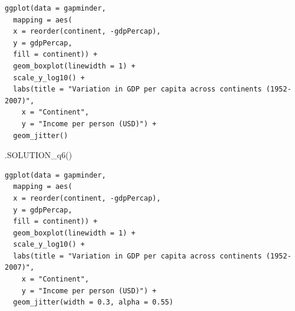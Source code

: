 \documentclass[
  letterpaper,
  DIV=11,
  numbers=noendperiod]{scrreprt}
\newenvironment{Shaded}{\begin{snugshade}}{\end{snugshade}}
\newcommand{\FunctionTok}[1]{\textcolor[rgb]{0.28,0.35,0.67}{#1}}
\newcommand{\NormalTok}[1]{\textcolor[rgb]{0.00,0.23,0.31}{#1}}
\begin{document}
\begin{verbatim}
ggplot(data = gapminder,
  mapping = aes(
  x = reorder(continent, -gdpPercap), 
  y = gdpPercap, 
  fill = continent)) +
  geom_boxplot(linewidth = 1) +
  scale_y_log10() +
  labs(title = "Variation in GDP per capita across continents (1952-2007)",
    x = "Continent",
    y = "Income per person (USD)") + 
  geom_jitter()
\end{verbatim}

\begin{Shaded}
\begin{Highlighting}[]
\FunctionTok{.SOLUTION\_q6}\NormalTok{()}
\end{Highlighting}
\end{Shaded}

\begin{verbatim}
ggplot(data = gapminder,
  mapping = aes(
  x = reorder(continent, -gdpPercap), 
  y = gdpPercap, 
  fill = continent)) +
  geom_boxplot(linewidth = 1) +
  scale_y_log10() +
  labs(title = "Variation in GDP per capita across continents (1952-2007)",
    x = "Continent",
    y = "Income per person (USD)") + 
  geom_jitter(width = 0.3, alpha = 0.55)
\end{verbatim}
\end{document}
